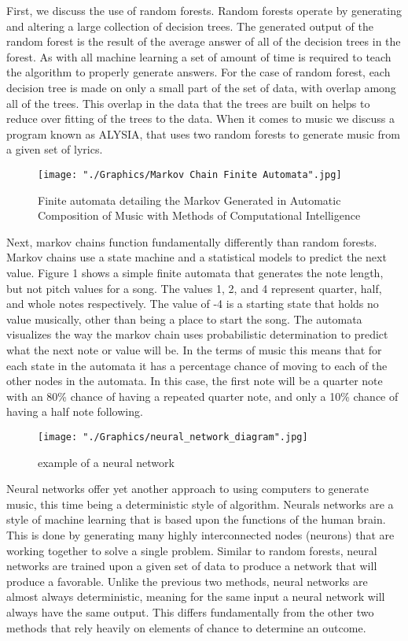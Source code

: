 \documentclass{sig-alternate}
\begin{document}
	First, we discuss the use of random forests. Random forests operate by generating and altering a large collection of decision trees. The generated output of the random forest is the result of the average answer of all of the decision trees in the forest. As with all machine learning a set of amount of time is required to teach the algorithm to properly generate answers. For the case of random forest, each decision tree is made on only a small part of the set of data, with overlap among all of the trees. This overlap in the data that the trees are built on helps to reduce over fitting of the trees to the data. When it comes to music we discuss a program known as ALYSIA, that uses two random forests to generate music from a given set of lyrics.
\begin{figure}[H]
	\texttt{[image: "./Graphics/Markov Chain Finite Automata".jpg]}
	\caption{Finite automata detailing the Markov Generated in Automatic Composition of Music with Methods of Computational Intelligence}
	\label{fig:markovchain1}
\end{figure}
	Next, markov chains function fundamentally differently than random forests. Markov chains use a state machine and a statistical models to predict the next value. Figure 1 shows a simple finite automata that generates the note length, but not pitch values for a song. The values 1, 2, and 4 represent quarter, half, and whole notes respectively. The value of -4 is a starting state that holds no value musically, other than being a place to start the song. The automata visualizes the way the markov chain uses probabilistic determination to predict what the next note or value will be. In the terms of music this means that for each state in the automata it has a percentage chance of moving to each of the other nodes in the automata. In this case, the first note will be a quarter note with an 80\% chance of having a repeated quarter note, and only a 10\% chance of having a half note following.


\begin{figure}[H]
	\texttt{[image: "./Graphics/neural\_network\_diagram".jpg]}
	\caption{example of a neural network}
	\label{fig:neuralnetexample}
\end{figure}
	
	Neural networks offer yet another approach to using computers to generate music, this time being a deterministic style of algorithm. Neurals networks are a style of machine learning that is based upon the functions of the human brain. This is done by generating many highly interconnected nodes (neurons) that are working together to solve a single problem. Similar to random forests, neural networks are trained upon a given set of data to produce a network that will produce a favorable. Unlike the previous two methods, neural networks are almost always deterministic, meaning for the same input a neural network will always have the same output. This differs fundamentally from the other two methods that rely heavily on elements of chance to determine an outcome.
\end{document}
